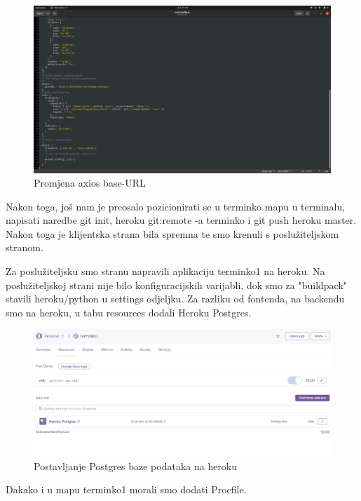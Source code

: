 			\begin{figure}[H]
				\centering
				\includegraphics[scale=0.25]{slike/PromjenaFrontend.PNG}
				\caption{Promjena axios base-URL}
				\label{fig:promjene}
			\end{figure}
		
			Nakon toga, još nam je preosalo pozicionirati se u terminko mapu u terminalu, napisati naredbe git init, heroku git:remote -a terminko i git push heroku master. Nakon toga je klijentska strana bila spremna te smo krenuli s poslužiteljskom stranom.
			
			Za poslužiteljsku smo stranu napravili aplikaciju terminko1 na heroku. Na poslužiteljskoj strani nije bilo konfiguracijskih varijabli, dok smo za "buildpack" stavili heroku/python u settings odjeljku. Za razliku od fontenda, na backendu smo na heroku, u tabu resources dodali Heroku Postgres.
			
			\begin{figure}[H]
				\centering
				\includegraphics[scale=0.50]{slike/Postgres.PNG}
				\caption{Postavljanje Postgres baze podataka na heroku}
				\label{fig:promjene}
			\end{figure}
		
			Dakako i u mapu terminko1 morali smo dodati Procfile.
			
